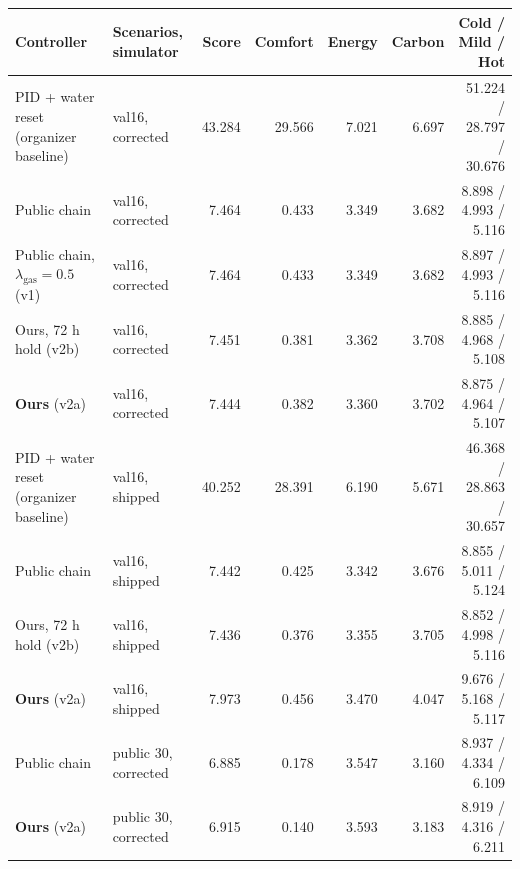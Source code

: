 \begin{tabular}{llrrrrr}
\toprule
Controller & Scenarios, simulator & Score & Comfort & Energy & Carbon & Cold / Mild / Hot \\
\midrule
PID + water reset (organizer baseline) & val16, corrected & 43.284 & 29.566 & 7.021 & 6.697 & 51.224 / 28.797 / 30.676 \\
Public chain~\citep{penguin2026} & val16, corrected & 7.464 & 0.433 & 3.349 & 3.682 & 8.898 / 4.993 / 5.116 \\
Public chain, $\lambda_{\mathrm{gas}}=0.5$ (v1) & val16, corrected & 7.464 & 0.433 & 3.349 & 3.682 & 8.897 / 4.993 / 5.116 \\
\rowcolor[HTML]{EDF3FC}Ours, 72 h hold (v2b) & val16, corrected & 7.451 & 0.381 & 3.362 & 3.708 & 8.885 / 4.968 / 5.108 \\
\rowcolor[HTML]{EDF3FC}\textbf{Ours} (v2a) & val16, corrected & 7.444 & 0.382 & 3.360 & 3.702 & 8.875 / 4.964 / 5.107 \\
\midrule
PID + water reset (organizer baseline) & val16, shipped & 40.252 & 28.391 & 6.190 & 5.671 & 46.368 / 28.863 / 30.657 \\
Public chain~\citep{penguin2026} & val16, shipped & 7.442 & 0.425 & 3.342 & 3.676 & 8.855 / 5.011 / 5.124 \\
\rowcolor[HTML]{EDF3FC}Ours, 72 h hold (v2b) & val16, shipped & 7.436 & 0.376 & 3.355 & 3.705 & 8.852 / 4.998 / 5.116 \\
\rowcolor[HTML]{EDF3FC}\textbf{Ours} (v2a) & val16, shipped & 7.973 & 0.456 & 3.470 & 4.047 & 9.676 / 5.168 / 5.117 \\
\midrule
Public chain~\citep{penguin2026} & public 30, corrected & 6.885 & 0.178 & 3.547 & 3.160 & 8.937 / 4.334 / 6.109 \\
\rowcolor[HTML]{EDF3FC}\textbf{Ours} (v2a) & public 30, corrected & 6.915 & 0.140 & 3.593 & 3.183 & 8.919 / 4.316 / 6.211 \\
\bottomrule
\end{tabular}